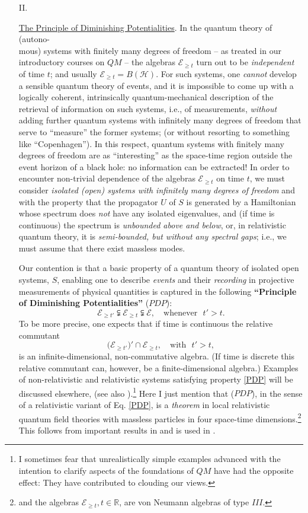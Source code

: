 \documentclass[a4paper,11pt]{article}
\begin{document}
\begin{enumerate}
\item[II.]{\underline{The Principle of Diminishing Potentialities}. In the quantum theory of (autono-\\mous) systems with finitely many degrees of freedom -- as treated in our introductory courses on $QM$ -- the algebras $\mathcal{E}_{\geq t}$ turn out to be \textit{independent} of time $t$; and usually $\mathcal{E}_{\geq t}= B(\mathcal{H})$. For such systems, one \textit{cannot} develop a sensible quantum theory of events, and it is impossible to come up with a logically coherent, intrinsically quantum-mechanical description of the retrieval of information on such systems, i.e., of measurements, \textit{without} adding further quantum systems with infinitely many degrees of freedom that serve to ``measure'' the former systems; (or without resorting to something like ``Copenhagen''). In this respect, quantum systems with finitely many degrees of freedom are as ``interesting'' as the space-time region outside the event horizon of a black hole: no information can be extracted! In order to encounter non-trivial dependence of the algebras $\mathcal{E}_{\geq t}$ on time $t$, we must consider \textit{isolated (open) systems with infinitely many degrees of freedom} and with the property that the propagator $U$ of $S$ is generated by a Hamiltonian whose spectrum does \textit{not} have any isolated eigenvalues, and (if time is continuous) the spectrum is \textit{unbounded above and below}, or, in relativistic quantum theory, it is \textit{semi-bounded, but without any spectral gaps}; i.e., we must assume that there exist massless modes.

 Our contention is that a basic property of a quantum theory of isolated open systems, $S$, enabling one to describe \textit{events} and their \textit{recording} in projective measurements of physical quantities is captured in the following {\bf{``Principle of Diminishing Potentialities''}} ($PDP$):
\begin{equation}\label{PDP}
\boxed{\mathcal{E}_{\geq t'} \subsetneqq \mathcal{E}_{\geq t} \subsetneqq \mathcal{E}, \quad \text{whenever}\,\,\,\, t'>t.}
\end{equation}
To be more precise, one expects that if time is continuous the relative commutant
$$\big(\mathcal{E}_{\geq t'}\big){'} \cap \mathcal{E}_{\geq t},\quad \text{with   }\,\, t'>t,$$
is an infinite-dimensional, non-commutative algebra. (If time is discrete this relative commutant can, however, be a finite-dimensional algebra.) Examples of non-relativistic and relativistic systems satisfying property \eqref{PDP} will be discussed elsewhere, (see also \cite{Les-Diablerets}).\footnote{I sometimes fear that unrealistically simple examples advanced with the intention to clarify aspects of the foundations of $QM$ have had the opposite effect: They have contributed to clouding our views.} Here I just mention that ($PDP$), in the sense of a relativistic variant of Eq. \eqref{PDP}, is a \textit{theorem} in local relativistic quantum field theories with massless particles in four space-time dimensions.\footnote{and the algebras $\mathcal{E}_{\geq t}, t \in \mathbb{R}$, are von Neumann algebras of type $III$.} This follows from important results in \cite{Buchholz} and is used in \cite{Fr}.

}
\end{enumerate}
\end{document}

